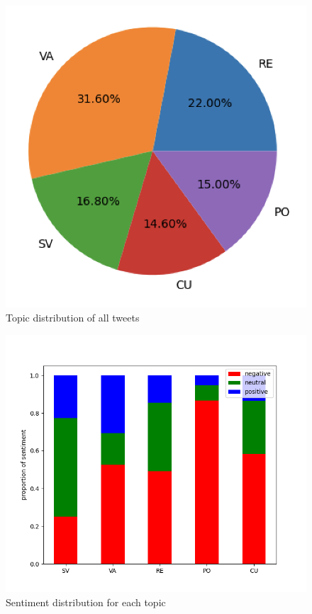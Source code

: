 \documentclass[letterpaper]{article} %
\begin{document}
\begin{figure}[h]
    \centering
    \includegraphics[scale=0.4]{top_dist.png}
    \caption{Topic distribution of all tweets}
    \label{fig:top-dist}
\end{figure}
\begin{figure}[H]
    \centering
    \includegraphics[scale=0.5]{topic_sentiment.png}
    \caption{Sentiment distribution for each topic}
    \label{fig:sent-top-dist}
\end{figure}
\end{document}
